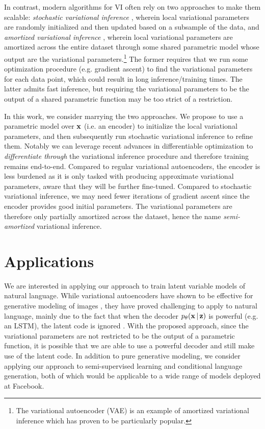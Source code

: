 \documentclass{article}
\begin{document}
In contrast, modern algorithms for VI often rely on two approaches to make them scalable: \emph{stochastic variational inference} \cite{Hoffman2013}, wherein local variational parameters are randomly initialized and then updated based on 
a subsample of the data, and \emph{amortized variational inference} \cite{Kingma2014,Rezende2014}, wherein local variational parameters are amortized across the entire dataset through some shared parametric model whose output are the variational parameters.\footnote{The variational autoencoder (VAE) is an example of amortized variational inference which has proven to be particularly popular.} 
The former requires that we run some optimization procedure (e.g. gradient ascent) to find the variational parameters for each data point, which could result in long inference/training times. The latter admits fast inference, but requiring the variational parameters to be the output of a shared parametric function may be too strict of a restriction.

In this work, we consider marrying the two approaches. We propose to use a parametric model over $\mathbf{x}$ (i.e. an encoder) to initialize the local variational parameters, and then subsequently run stochastic variational inference to refine them. Notably we can leverage recent advances in differentiable optimization \cite{Domke2012,Maclaurin2015} to \emph{differentiate through} the variational inference procedure and therefore training remains end-to-end. 
Compared to regular variational autoencoders, the encoder is less burdened as it is only tasked with producing approximate variational parameters, aware that they will be further fine-tuned. Compared to stochastic variational inference, we may need fewer iterations of gradient ascent since the encoder provides good initial parameters. The variational parameters are therefore only partially amortized
across the dataset, hence the name \emph{semi-amortized} variational inference.
\vspace{-4mm}
\section{Applications}
\vspace{-4mm}
We are interested in applying our approach to train latent
variable models of natural language.
While variational autoencoders have 
shown to be effective for generative modeling of images \cite{Chen2017}, they have proved challenging to apply
to natural language, mainly due to the fact that when the decoder $p_\theta(\mathbf{x} \,|\, \mathbf{z})$ is powerful (e.g. an LSTM), the latent code is ignored \cite{Bowman2016}. With the proposed approach, since the variational parameters are not restricted to be the output of a parametric function, it is 
possible that we are able to use a powerful decoder and still make use of the latent
code. In addition to pure generative modeling, we consider applying our approach to semi-supervised learning and conditional language generation, both of which would be applicable to a wide range of models deployed at Facebook.
\vspace{-4mm}
\end{document}
